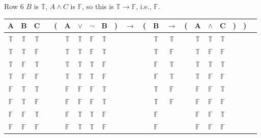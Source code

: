 \documentclass[
  ignorenonframetext,
]{beamer}
\renewcommand{\,}{\text{, }}
\def\True{\mathbb{T}}
\def\False{\mathbb{F}}
\begin{document}
\begin{frame}{Row 6}
\protect\hypertarget{row-6}{}
\(B\) is \(\True\), \(A \wedge C\) is \(\False\), so this is
\(\True \rightarrow \False\), i.e., \(\False\).

\begin{center}

\begin{tabular}{@{ }c@{ }@{ }c@{ }@{ }c | c@{ }@{}c@{}@{ }c@{ }@{ }c@{ }@{ }c@{ }@{ }c@{ }@{}c@{}@{ }c@{ }@{}c@{}@{ }c@{ }@{ }c@{ }@{}c@{}@{ }c@{ }@{ }c@{ }@{ }c@{ }@{}c@{}@{}c@{}@{ }c}
A & B & C &  & ( & A & $\vee$ & $\neg$ & B & ) & $\rightarrow$ & ( & B & $\rightarrow$ & ( & A & $\wedge$ & C & ) & ) & \\
\hline 
 $\True$ & $\True$ & $\True$ &  &  & $\True$ & $\True$ & $\False$ & $\True$ &  &&  & $\True$ & $\True$ &  & $\True$ & $\True$ & $\True$ &  &  & \\
 $\True$ & $\True$ & $\False$ &  &  & $\True$ & $\True$ & $\False$ & $\True$ &  &&  & $\True$ & $\False$ &  & $\True$ & $\False$ & $\False$ &  &  & \\
 $\True$ & $\False$ & $\True$ &  &  & $\True$ & $\True$ & $\True$ & $\False$ &  &&  & $\False$ & $\True$ &  & $\True$ & $\True$ & $\True$ &  &  & \\
 $\True$ & $\False$ & $\False$ &  &  & $\True$ & $\True$ & $\True$ & $\False$ &  &&  & $\False$ & $\True$ &  & $\True$ & $\False$ & $\False$ &  &  & \\
 $\False$ & $\True$ & $\True$ &  &  & $\False$ & $\False$ & $\False$ & $\True$ &  &&  & $\True$ & $\False$ &  & $\False$ & $\False$ & $\True$ &  &  & \\
 $\False$ & $\True$ & $\False$ &  &  & $\False$ & $\False$ & $\False$ & $\True$ &  &&  & $\True$ & $\False$ &  & $\False$ & $\False$ & $\False$ &  &  & \\
 $\False$ & $\False$ & $\True$ &  &  & $\False$ & $\True$ & $\True$ & $\False$ &  &&  & $\False$ &&  & $\False$ & $\False$ & $\True$ &  &  & \\
 $\False$ & $\False$ & $\False$ &  &  & $\False$ & $\True$ & $\True$ & $\False$ &  &&  & $\False$ &&  & $\False$ & $\False$ & $\False$ &  &  & \\
\end{tabular}

\end{center}
\end{frame}
\end{document}
